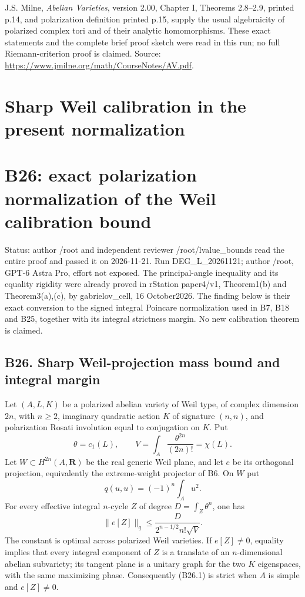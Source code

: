 \documentclass[11pt,a4paper]{article}
\providecommand{\tightlist}{\setlength{\itemsep}{0pt}\setlength{\parskip}{0pt}}
\theoremstyle{definition}
\begin{document}
J.S. Milne, \emph{Abelian Varieties}, version 2.00, Chapter I, Theorems 2.8--2.9, printed p.14, and polarization definition printed p.15, supply the usual algebraicity of polarized complex tori and of their analytic homomorphisms. These exact statements and the complete brief proof sketch were read in this run; no full Riemann-criterion proof is claimed. Source: \url{https://www.jmilne.org/math/CourseNotes/AV.pdf}.

\section{Sharp Weil calibration in the present normalization}

\providecommand{\tightlist}{\setlength{\itemsep}{0pt}\setlength{\parskip}{0pt}}
\section{B26: exact polarization normalization of the Weil calibration bound}\label{b26-exact-polarization-normalization-of-the-weil-calibration-bound}

Status: author /root and independent reviewer /root/lvalue\_bounds read the entire proof and passed it on 2026-11-21. Run DEG\_L\_20261121; author /root, GPT-6 Astra Pro, effort not exposed. The principal-angle inequality and its equality rigidity were already proved in rStation paper4/v1, Theorem1(b) and Theorem3(a),(c), by gabrielov\_cell, 16 October2026. The finding below is their exact conversion to the signed integral Poincare normalization used in B7, B18 and B25, together with its integral strictness margin. No new calibration theorem is claimed.

\subsection{B26. Sharp Weil-projection mass bound and integral margin}\label{b26.-sharp-weil-projection-mass-bound-and-integral-margin}

Let \((A,L,K)\) be a polarized abelian variety of Weil type, of complex dimension \(2n\), with \(n\ge2\), imaginary quadratic action \(K\) of signature \((n,n)\), and polarization Rosati involution equal to conjugation on \(K\). Put \[
 \theta=c_1(L),\qquad V=\int_A\frac{\theta^{2n}}{(2n)!}=\chi(L).
\] Let \(W\subset H^{2n}(A,\mathbf R)\) be the real generic Weil plane, and let \(e\) be its orthogonal projection, equivalently the extreme-weight projector of B6. On \(W\) put \[
 q(u,u)=(-1)^n\int_Au^2.
\] For every effective integral \(n\)-cycle \(Z\) of degree \(D=\int_Z\theta^n\), one has \[
 \boxed{\quad
 \|e[Z]\|_q\le
 \frac{D}{2^{n-1/2}n!\sqrt V}.
 \quad}
 \tag{B26.1}
\] The constant is optimal across polarized Weil varieties. If \(e[Z]\ne0\), equality implies that every integral component of \(Z\) is a translate of an \(n\)-dimensional abelian subvariety; its tangent plane is a unitary graph for the two \(K\) eigenspaces, with the same maximizing phase. Consequently (B26.1) is strict when \(A\) is simple and \(e[Z]\ne0\).
\end{document}
